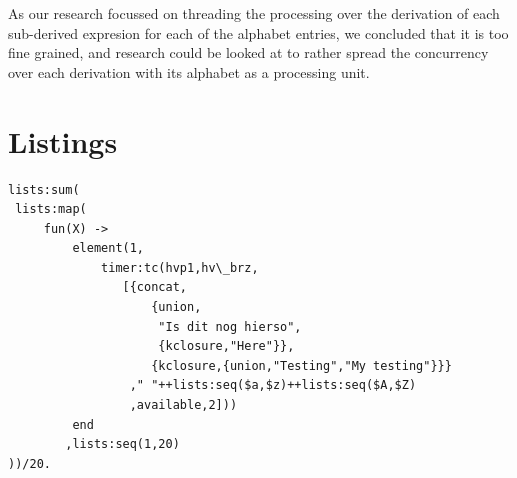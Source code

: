 \documentclass[a4paper,11pt]{report}
\begin{document}
As our research focussed on threading the processing over the
derivation of each sub-derived expresion for each of the alphabet
entries, we concluded that it is too fine grained, and research could
be looked at to rather spread the concurrency over each derivation
with its alphabet as a processing unit.




\appendix
\chapter{Listings}
\begin{lstlisting}
lists:sum(
 lists:map(
	 fun(X) -> 
		 element(1,
			 timer:tc(hvp1,hv\_brz,
				[{concat,
					{union,
					 "Is dit nog hierso",
					 {kclosure,"Here"}},
					{kclosure,{union,"Testing","My testing"}}}
				 ," "++lists:seq($a,$z)++lists:seq($A,$Z)
				 ,available,2]))
		 end
		,lists:seq(1,20)
))/20. 
\end{lstlisting}
\end{document}
